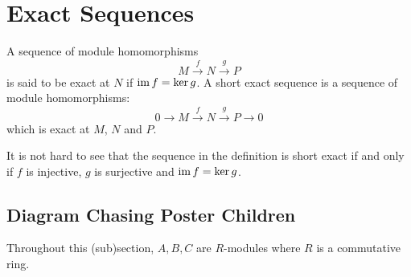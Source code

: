 \section{Exact Sequences}

\begin{definition}
    A sequence of module homomorphisms 
    \begin{equation*}
        M\stackrel{f}{\longrightarrow} N\stackrel{g}{\longrightarrow}P
    \end{equation*}
    is said to be exact at $N$ if $\operatorname{im} f = \ker g$. A short exact sequence is a sequence of module homomorphisms: 
    \begin{equation*}
        0\longrightarrow M\stackrel{f}{\longrightarrow} N\stackrel{g}{\longrightarrow} P\longrightarrow 0
    \end{equation*}
    which is exact at $M$, $N$ and $P$.
\end{definition}

It is not hard to see that the sequence in the definition is short exact if and only if $f$ is injective, $g$ is surjective and $\operatorname{im} f = \ker g$.

\subsection{Diagram Chasing Poster Children}
Throughout this (sub)section, $A,B,C$ are $R$-modules where $R$ is a commutative ring.

